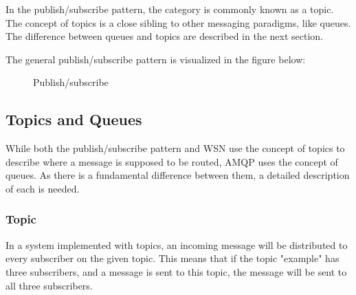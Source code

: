 In the publish/subscribe pattern, the category is commonly known as a topic. The concept of topics is a close sibling to other messaging paradigms, like queues. The difference between queues and topics are described in the next section. 

The general publish/subscribe pattern is visualized in the figure \cite{pub-sub-image} below:

\begin{center}
  \begin{figure}[ht]
    \caption{Publish/subscribe}
    \label{fig:publish-subscribe}
  \end{figure}
\end{center}

\subsection{Topics and Queues}
\label{subsec:architecture_and_implementation-topic_and_queue_differecnce}
While both the publish/subscribe pattern and WSN use the concept of topics to describe where a message is supposed to be routed, AMQP uses the concept of queues. As there is a fundamental difference between them, a detailed description of each is needed.

\subsubsection{Topic}
In a system implemented with topics, an incoming message will be distributed to every subscriber on the given topic. This means that if the topic "example" has three subscribers, and a message is sent to this topic, the message will be sent to all three subscribers.

